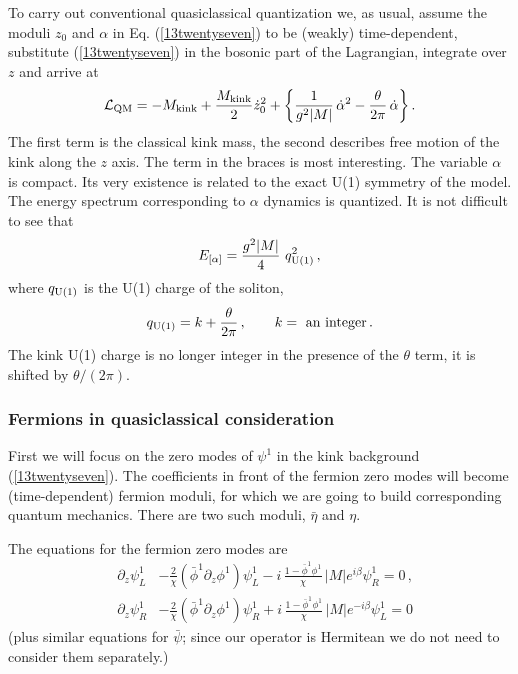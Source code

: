 \documentclass[epsfig,12pt]{article}
\def\beq{\begin{equation}}
\def\eeq{\end{equation}}
\def\beqn{\begin{eqnarray}}
\def\eeqn{\end{eqnarray}}
\def\beqn{\begin{eqnarray}}
\def\eeqn{\end{eqnarray}}
\def\beq{\begin{equation}}
\def\eeq{\end{equation}}
\begin{document}
To carry out  conventional
quasiclassical quantization we, as usual,
assume the moduli $z_0$ and $\alpha$ in Eq. (\ref{13twentyseven})
to be (weakly) time-dependent, substitute  (\ref{13twentyseven})
in the bosonic part of the Lagrangian, integrate over $z$
and arrive at
\beq
{\cal L}_{\rm QM} = -M_{\rm kink} +\frac{M_{\rm kink}}{2} \dot z_0^2 
+\left\{\frac{1}{g^2|M|}\, \dot\alpha^2  
-\frac{\theta}{2\pi}\,\dot\alpha
\right\}.
\label{13twentynine}
\eeq
The first term is the classical kink mass, the second describes
free motion of the kink along the $z$ axis.
The term in the braces is most interesting.
The variable $\alpha$ is compact.
Its very existence is related to the exact U(1) symmetry of the model.
The energy spectrum corresponding
to $\alpha$ dynamics is quantized.
It is not difficult to see that
\beq
E_{[\alpha ]}= \frac{g^2 |M|}{4}\,\, q_{\rm U(1)}^2\,,
\label{13thirty}
\eeq
where
$ q_{\rm U(1)}$ is the U(1) charge of the soliton,
\beq
 q_{\rm U(1)} = k +\frac{\theta}{2\pi}\,,\qquad k =\mbox{ an integer}\,.
\label{13thirtyone}
\eeq
The kink U(1) charge is no longer integer
in the presence of the $\theta$ term, it is shifted by $\theta/(2\pi )$.


\subsubsection{Fermions in quasiclassical consideration}

First we will  focus on the 
zero modes of $\psi^1$ in the kink background (\ref{13twentyseven}).
The coefficients
in front of the fermion zero modes will become (time-dependent)
 fermion moduli, for which we are going to build
corresponding quantum mechanics. 
There are two such moduli, $\bar\eta$ and $\eta$.

The equations for the fermion zero modes are
\beqn
&\partial_z\psi_L^1&    - \frac{2}{\chi}\left(\bar\phi^1\partial_z\phi^1
\right)\psi_L^1 -i\,\frac{1-\bar\phi^1\phi^1}{\chi}\, |M| e^{i\beta}\psi_R^1
=0\,,
\nonumber\\[3mm]
&\partial_z\psi_R^1&   - \frac{2}{\chi}\left(\bar\phi^1\partial_z\phi^1
\right)\psi_R^1 + i\,\frac{1-\bar\phi^1\phi^1}{\chi}\, |M| e^{- i\beta}\psi_L^1=0
\label{13fourtyfour}
\eeqn
(plus   similar equations for $\bar\psi$; since our operator is 
Hermitean we do not need to consider them separately.)
\end{document}
